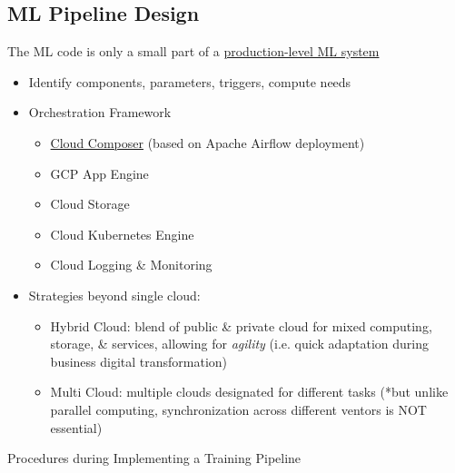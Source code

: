 \documentclass[10pt,landscape,letterpaper]{cheatsheet}
\begin{document}
\begin{multicols}{3}
\subsection{ML Pipeline Design}

The ML code is only a small part of a \href{https://cloud.google.com/products/operations}{production-level ML system}

\begin{itemize}
    \item Identify components, parameters, triggers, compute needs
    \item Orchestration Framework
    \begin{itemize}
        \item \href{https://cloud.google.com/composer/docs/concepts/overview}{Cloud Composer} (based on Apache Airflow deployment)
        \item GCP App Engine
        \item Cloud Storage
        \item Cloud Kubernetes Engine
        \item Cloud Logging \& Monitoring
    \end{itemize}
    \item Strategies beyond single cloud:
    \begin{itemize}
        \item Hybrid Cloud: blend of public \& private cloud for mixed computing, storage, \& services, allowing for \textit{agility} (i.e. quick adaptation during business digital transformation)
        \item Multi Cloud: multiple clouds designated for different tasks (*but unlike parallel computing, synchronization across different ventors is NOT essential)
    \end{itemize}
\end{itemize}

Procedures during Implementing a Training Pipeline


\end{multicols}
\end{document}
